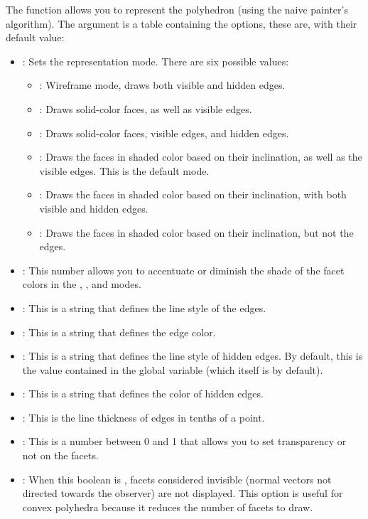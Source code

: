 The function  allows you to represent the polyhedron  (using the naive painter's algorithm). The argument  is a table containing the options, these are, with their default value:
\begin{itemize}
    \item {}: Sets the representation mode. There are six possible values:
\begin{itemize}
    \item {}: Wireframe mode, draws both visible and hidden edges.
    \item {}: Draws solid-color faces, as well as visible edges.
    \item {}: Draws solid-color faces, visible edges, and hidden edges.
    \item {}: Draws the faces in shaded color based on their inclination, as well as the visible edges. This is the default mode.
    \item {}: Draws the faces in shaded color based on their inclination, with both visible and hidden edges.
    \item {}: Draws the faces in shaded color based on their inclination, but not the edges.
\end{itemize}
    \item {}: This number allows you to accentuate or diminish the shade of the facet colors in the , , and  modes.
    \item {}: This is a string that defines the line style of the edges.
    \item {}: This is a string that defines the edge color.
    \item {}: This is a string that defines the line style of hidden edges. By default, this is the value contained in the global variable  (which itself is  by default).
    \item {}: This is a string that defines the color of hidden edges.
    \item {}: This is the line thickness of edges in tenths of a point.
    \item {} : This is a number between 0 and 1 that allows you to set transparency or not on the facets.
    \item {}: When this boolean is \true, facets considered invisible (normal vectors not directed towards the observer) are not displayed. This option is useful for convex polyhedra because it reduces the number of facets to draw.
    

\end{itemize}

